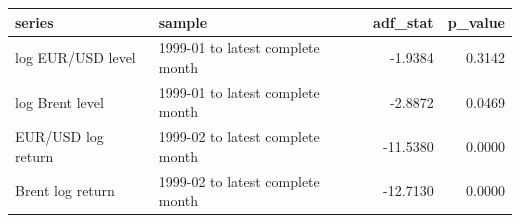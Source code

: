 \begin{tabular}{llrr}
\toprule
series & sample & adf\_stat & p\_value \\
\midrule
log EUR/USD level & 1999-01 to latest complete month & -1.9384 & 0.3142 \\
log Brent level & 1999-01 to latest complete month & -2.8872 & 0.0469 \\
EUR/USD log return & 1999-02 to latest complete month & -11.5380 & 0.0000 \\
Brent log return & 1999-02 to latest complete month & -12.7130 & 0.0000 \\
\bottomrule
\end{tabular}
